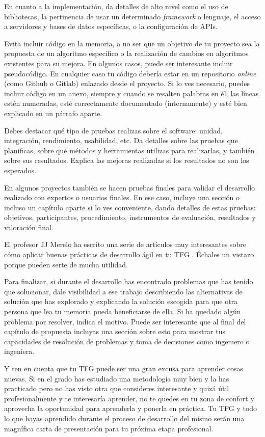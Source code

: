 En cuanto a la implementación, da detalles de alto nivel como el uso de bibliotecas, la pertinencia de usar un determinado \textit{framework} o lenguaje, el acceso a servidores y bases de datos específicas, o la configuración de APIs.

Evita incluir código en la memoria, a no ser que un objetivo de tu proyecto sea la propuesta de un algoritmo específico o la realización de cambios en algoritmos existentes para su mejora. En algunos casos, puede ser interesante incluir pseudocódigo. En cualquier caso tu código debería estar en un repositorio \textit{online} (como Github o Gitlab) enlazado desde el proyecto. Si lo ves necesario, puedes incluir código en un anexo, siempre y cuando se resalten palabras en él, las líneas estén numeradas, esté correctamente documentado (internamente) y esté bien explicado en un párrafo aparte.

Debes destacar qué tipo de pruebas realizas sobre el software: unidad, integración, rendimiento, usabilidad, etc. Da detalles sobre las pruebas que planificas, sobre qué métodos y herramientas utilizas para realizarlas, y también sobre sus resultados. Explica las mejoras realizadas si los resultados no son los esperados. 

En algunos proyectos también se hacen pruebas finales para validar el desarrollo realizado con expertos o usuarios finales. En ese caso, incluye una sección o incluso un capítulo aparte si lo ves conveniente, dando detalles de estas pruebas: objetivos, participantes, procedimiento, instrumentos de evaluación, resultados y valoración final.

El profesor JJ Merelo ha escrito una serie de artículos muy interesantes sobre cómo aplicar buenas prácticas de desarrollo ágil en tu TFG \cite{TFGs2024JJ}. Échales un vistazo porque pueden serte de mucha utilidad. 

Para finalizar, si durante el desarrollo has encontrado problemas que has tenido que solucionar, dale visibilidad a ese trabajo describiendo las alternativas de solución que has explorado y explicando la solución escogida para que otra persona que lea tu memoria pueda beneficiarse de ella. Si ha quedado algún problema por resolver, indica el motivo. Puede ser interesante que al final del capítulo de propuesta incluyas una sección sobre esto para mostrar tus capacidades de resolución de problemas y toma de decisiones como ingeniero o ingeniera. 

Y ten en cuenta que tu TFG puede ser una gran excusa para aprender cosas nuevas. Si en el grado has estudiado una metodología muy bien y la has practicado pero no has visto otra que consideres interesante y quizá útil profesionalmente y te interesaría aprender, no te quedes en tu zona de confort y aprovecha la oportunidad para aprenderla y ponerla en práctica. Tu TFG y todo lo que hayas aprendido durante el proceso de desarrollo del mismo serán una magnífica carta de presentación para tu próxima etapa profesional.
